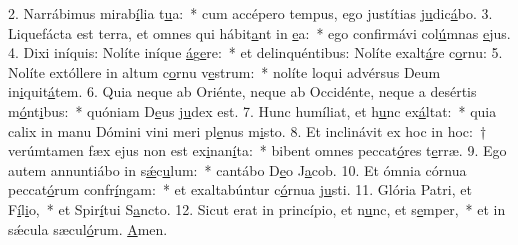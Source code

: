 2. Narrábimus mirab\uline{í}lia t\uline{u}a:~* cum accépero tempus, ego justítias j\uline{u}dic\uline{á}bo.
3. Liquefácta est terra, et omnes qui hábit\uline{a}nt in \uline{e}a:~* ego confirmávi col\uline{ú}mnas \uline{e}jus.
4. Dixi iníquis: Nolíte iníque \uline{á}g\uline{e}re:~* et delinquéntibus: Nolíte exalt\uline{á}re c\uline{o}rnu:
5. Nolíte extóllere in altum c\uline{o}rnu v\uline{e}strum:~* nolíte loqui advérsus Deum in\uline{i}quit\uline{á}tem.
6. Quia neque ab Oriénte, neque ab Occidénte, neque a desértis m\uline{ó}nt\uline{i}bus:~* quóniam D\uline{e}us j\uline{u}dex est.
7. Hunc humíliat, et h\uline{u}nc ex\uline{á}ltat:~* quia calix in manu Dómini vini meri pl\uline{e}nus m\uline{i}sto.
8. Et inclinávit ex hoc in hoc:~† verúmtamen fæx ejus non est ex\uline{i}nan\uline{í}ta:~* bibent omnes peccat\uline{ó}res t\uline{e}rræ.
9. Ego autem annuntiábo in s\uline{ǽ}c\uline{u}lum:~* cantábo D\uline{e}o J\uline{a}cob.
10. Et ómnia córnua peccat\uline{ó}rum confr\uline{í}ngam:~* et exaltabúntur c\uline{ó}rnua j\uline{u}sti.
11. Glória Patri, et F\uline{í}l\uline{i}o,~* et Spir\uline{í}tui S\uline{a}ncto.
12. Sicut erat in princípio, et n\uline{u}nc, et s\uline{e}mper,~* et in sǽcula sæcul\uline{ó}rum. \uline{A}men.
